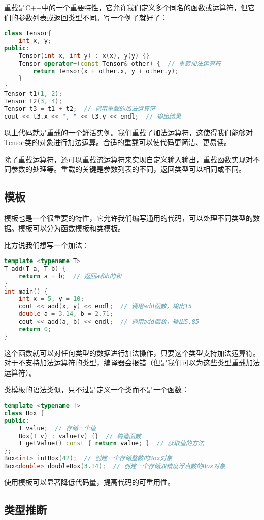 \documentclass[../main.tex]{subfiles}
\begin{document}
重载是C++中的一个重要特性，它允许我们定义多个同名的函数或运算符，但它们的参数列表或返回类型不同。写一个例子就好了：

\begin{lstlisting}[language=C++]
class Tensor{
    int x, y;
public:
    Tensor(int x, int y) : x(x), y(y) {}
    Tensor operator+(const Tensor& other) {  // 重载加法运算符
        return Tensor(x + other.x, y + other.y);
    }
}
Tensor t1(1, 2);
Tensor t2(3, 4);
Tensor t3 = t1 + t2;  // 调用重载的加法运算符
cout << t3.x << ", " << t3.y << endl;  // 输出结果
\end{lstlisting}
以上代码就是重载的一个鲜活实例。我们重载了加法运算符，这使得我们能够对Tensor类的对象进行加法运算。合适的重载可以使代码更简洁、更易读。

除了重载运算符，还可以重载流运算符来实现自定义输入输出，重载函数实现对不同参数的处理等。重载的关键是参数列表的不同，返回类型可以相同或不同。

\subsection{模板}

模板也是一个很重要的特性，它允许我们编写通用的代码，可以处理不同类型的数据。模板可以分为函数模板和类模板。

比方说我们想写一个加法：
\begin{lstlisting}[language=C++]
template <typename T>
T add(T a, T b) {
    return a + b;  // 返回a和b的和
}
int main() {
    int x = 5, y = 10;
    cout << add(x, y) << endl;  // 调用add函数，输出15
    double a = 3.14, b = 2.71;
    cout << add(a, b) << endl;  // 调用add函数，输出5.85
    return 0;
}
\end{lstlisting}
这个函数就可以对任何类型的数据进行加法操作，只要这个类型支持加法运算符。对于不支持加法运算符的类型，编译器会报错（但是我们可以为这些类型重载加法运算符）。

类模板的语法类似，只不过是定义一个类而不是一个函数：
\begin{lstlisting}[language=C++]
template <typename T>
class Box {
public:
    T value;  // 存储一个值
    Box(T v) : value(v) {}  // 构造函数
    T getValue() const { return value; }  // 获取值的方法
};
Box<int> intBox(42);  // 创建一个存储整数的Box对象
Box<double> doubleBox(3.14);  // 创建一个存储双精度浮点数的Box对象
\end{lstlisting}
使用模板可以显著降低代码量，提高代码的可重用性。

\subsection{类型推断}
\end{document}
